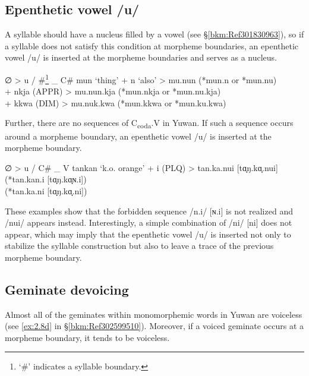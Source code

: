 \subsection{Epenthetic vowel /u/}
\label{bkm:Ref301838720}\hypertarget{RefHeadingToc395696980}{}\label{bkm:Ref347173344}
A syllable should have a nucleus filled by a vowel (see §\ref{bkm:Ref301830963}), so if a syllable does not satisfy this condition at morpheme boundaries, an epenthetic vowel /u/ is inserted at the morpheme boundaries and serves as a nucleus.

\ea  ∅   >   u   /   \#\footnote{‘\#’ indicates a syllable boundary.}   \_   C\#
\ex
\ea  mun   ‘thing’   +   n   ‘also’   >   mu.nun   (*mun.n or *mun.nu)\\
\ex  +   nkja   (APPR)   >   mu.nun.kja   (*mun.nkja or *mun.nu.kja)\\
\ex  +   kkwa   (DIM)   >   mu.nuk.kwa   (*mun.kkwa or *mun.ku.kwa)\\
\z
\z

Further, there are no sequences of C\textsubscript{coda}.V in Yuwan. If such a sequence occurs around a morpheme boundary, an epenthetic vowel /u/ is inserted at the morpheme boundary.

\ea   ∅   >   u   /   C\#   \_   V
\ex  \gll tankan   ‘k.o. orange’   +   i   (PLQ)   >   tan.ka.nui [tɑ̟ŋ.kɑ̟.nui]   (*tan.kan.i [tɑ̟ŋ.kɑ̟ɴ.i])\\
           {}         {}           {}  {}  {}      {}    {}          {}          (*tan.ka.ni [tɑ̟ŋ.kɑ̟.ni])\\
\z

These examples show that the forbidden sequence /n.i/ [ɴ.i] is not realized and /nui/ appears instead. Interestingly, a simple combination of /ni/ [ni] does not appear, which may imply that the epenthetic vowel /u/ is inserted not only to stabilize the syllable construction but also to leave a trace of the previous morpheme boundary.

\subsection{Geminate devoicing}
\label{bkm:Ref347178914}\hypertarget{RefHeadingToc395696981}{}
Almost all of the geminates within monomorphemic words in Yuwan are voiceless (see \ref{ex:2.8d} in §\ref{bkm:Ref302599510}). Moreover, if a voiced geminate occurs at a morpheme boundary, it tends to be voiceless.

